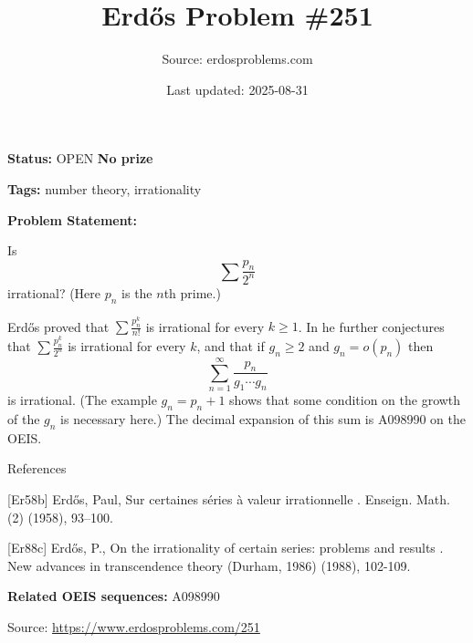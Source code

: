 \documentclass{article}
\title{Erd\H{o}s Problem \#251}
\date{Last updated: 2025-08-31}
\author{Source: erdosproblems.com}
\begin{document}
\maketitle

\noindent\textbf{Status:} OPEN \quad \textbf{No prize}

\noindent\textbf{Tags:} number theory, irrationality

\medskip

\noindent\textbf{Problem Statement:}

Is\[\sum \frac{p_n}{2^n}\]irrational? (Here $p_n$ is the $n$th prime.)




Erd\H{o}s \cite{Er58b} proved that $\sum \frac{p_n^k}{n!}$ is irrational for every $k\geq 1$. In \cite{Er88c} he further conjectures that $\sum \frac{p_n^k}{2^n}$ is irrational for every $k$, and that if $g_n\geq 2$ and $g_n=o(p_n)$ then\[\sum_{n=1}^\infty \frac{p_n}{g_1\cdots g_n}\]is irrational. (The example $g_n=p_n+1$ shows that some condition on the growth of the $g_n$ is necessary here.) The decimal expansion of this sum is A098990 on the OEIS.




References

[Er58b] Erd\H{o}s, Paul, Sur certaines s\'{e}ries \`a{} valeur irrationnelle . Enseign. Math. (2) (1958), 93--100.

[Er88c] Erd\H{o}s, P., On the irrationality of certain series: problems and results . New advances in transcendence theory (Durham, 1986) (1988), 102-109.

\noindent\textbf{Related OEIS sequences:} A098990


\bigskip
\noindent\small{Source: \url{https://www.erdosproblems.com/251}}
\end{document}
